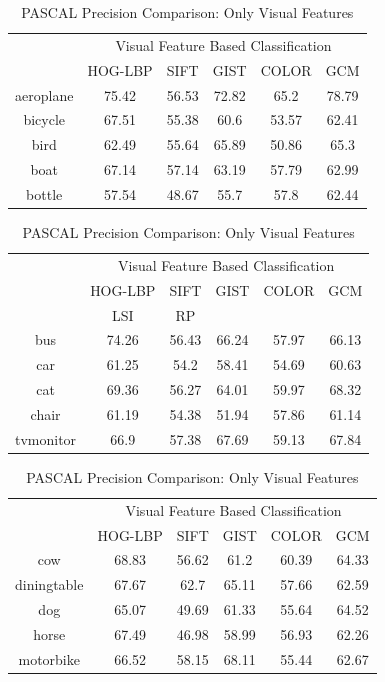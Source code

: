 \begin{table}[!ht]
\centering
\caption{ PASCAL Precision Comparison: Only Visual Features} %
\vspace*{0.2 cm}
\begin{tabular}{| c | c | c | c | c | c |}
\hline
 {\multirow{2}{*}{Labels}} & \multicolumn{5}{|c|}{Visual Feature Based Classification} \\ 
 \cline{2-6}
  & HOG-LBP & SIFT & GIST & COLOR & GCM \\  [1ex] \hline
aeroplane & 75.42 & 56.53 & 72.82 & 65.2 & 78.79 \\  [1ex] \hline
bicycle & 67.51 & 55.38 & 60.6 & 53.57 & 62.41 \\  [1ex] \hline
bird & 62.49 & 55.64 & 65.89 & 50.86 & 65.3 \\  [1ex] \hline
boat & 67.14 & 57.14 & 63.19 & 57.79 & 62.99 \\  [1ex] \hline
bottle & 57.54 & 48.67 & 55.7 & 57.8 & 62.44 \\  [1ex] \hline
\end{tabular}
 \hspace{1em}
\begin{tabular}{| c | c | c | c | c | c |}
\hline
 {\multirow{2}{*}{Labels}} & \multicolumn{5}{|c|}{Visual Feature Based Classification} \\ 
 \cline{2-6}
  & HOG-LBP & SIFT & GIST & COLOR & GCM \\  [1ex] \hline
 & LSI & RP \\ \hline
bus & 74.26 & 56.43 & 66.24 & 57.97 & 66.13 \\  [1ex] \hline
car & 61.25 & 54.2 & 58.41 & 54.69 & 60.63 \\  [1ex] \hline
cat & 69.36 & 56.27 & 64.01 & 59.97 & 68.32 \\  [1ex] \hline
chair & 61.19 & 54.38 & 51.94 & 57.86 & 61.14 \\  [1ex] \hline
tvmonitor & 66.9 & 57.38 & 67.69 & 59.13 & 67.84 \\  [1ex] \hline
\end{tabular}
 \hspace{1em}
 \begin{tabular}{| c | c | c | c | c | c |}
\hline
 {\multirow{2}{*}{Labels}} & \multicolumn{5}{|c|}{Visual Feature Based Classification} \\ 
 \cline{2-6}
  & HOG-LBP & SIFT & GIST & COLOR & GCM \\  [1ex] \hline
cow & 68.83 & 56.62 & 61.2 & 60.39 & 64.33 \\  [1ex] \hline
diningtable & 67.67 & 62.7 & 65.11 & 57.66 & 62.59 \\  [1ex] \hline
dog & 65.07 & 49.69 & 61.33 & 55.64 & 64.52 \\  [1ex] \hline
horse & 67.49 & 46.98 & 58.99 & 56.93 & 62.26 \\  [1ex] \hline
motorbike & 66.52 & 58.15 & 68.11 & 55.44 & 62.67 \\  [1ex] \hline
\end{tabular}
 \hspace{1em}
 

\end{table}
